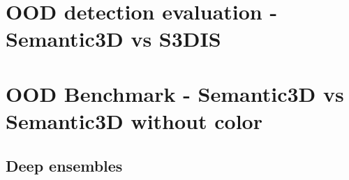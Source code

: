     \section{OOD detection evaluation - Semantic3D vs S3DIS}


    \section{OOD Benchmark - Semantic3D vs Semantic3D without color}
    \subsection{Deep ensembles}

